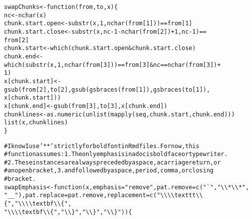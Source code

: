 \documentclass{article}\usepackage[]{graphicx}\usepackage[]{color}
\makeatletter
\newcommand{\hlnum}[1]{\textcolor[rgb]{0.863,0.196,0.184}{#1}}%
\newcommand{\hlstr}[1]{\textcolor[rgb]{0.863,0.196,0.184}{#1}}%
\newcommand{\hlcom}[1]{\textcolor[rgb]{0.345,0.431,0.459}{#1}}%
\newcommand{\hlopt}[1]{\textcolor[rgb]{0.576,0.631,0.631}{#1}}%
\newcommand{\hlstd}[1]{\textcolor[rgb]{0.514,0.58,0.588}{#1}}%
\newcommand{\hlkwa}[1]{\textcolor[rgb]{0.796,0.294,0.086}{#1}}%
\newcommand{\hlkwb}[1]{\textcolor[rgb]{0.522,0.6,0}{#1}}%
\newcommand{\hlkwc}[1]{\textcolor[rgb]{0.796,0.294,0.086}{#1}}%
\newcommand{\hlkwd}[1]{\textcolor[rgb]{0.576,0.631,0.631}{#1}}%
\newenvironment{kframe}{%
 \def\at@end@of@kframe{}%
 \ifinner\ifhmode%
  \def\at@end@of@kframe{\end{minipage}}%
  \begin{minipage}{\columnwidth}%
 \fi\fi%
 \def\FrameCommand##1{\hskip\@totalleftmargin \hskip-\fboxsep
 \colorbox{shadecolor}{##1}\hskip-\fboxsep
     \hskip-\linewidth \hskip-\@totalleftmargin \hskip\columnwidth}%
 \MakeFramed {\advance\hsize-\width
   \@totalleftmargin\z@ \linewidth\hsize
   \@setminipage}}%
 {\par\unskip\endMakeFramed%
 \at@end@of@kframe}
\newenvironment{knitrout}{}{} %
\makeatother
\begin{document}
\begin{knitrout}
\begin{kframe}
\begin{alltt}
    \hlstd{swapChunks} \hlkwb{<-} \hlkwa{function}\hlstd{(}\hlkwc{from}\hlstd{,} \hlkwc{to}\hlstd{,} \hlkwc{x}\hlstd{) \{}
        \hlstd{nc} \hlkwb{<-} \hlkwd{nchar}\hlstd{(x)}
        \hlstd{chunk.start.open} \hlkwb{<-} \hlkwd{substr}\hlstd{(x,} \hlnum{1}\hlstd{,} \hlkwd{nchar}\hlstd{(from[}\hlnum{1}\hlstd{]))} \hlopt{==} \hlstd{from[}\hlnum{1}\hlstd{]}
        \hlstd{chunk.start.close} \hlkwb{<-} \hlkwd{substr}\hlstd{(x, nc} \hlopt{-} \hlnum{1} \hlopt{-} \hlkwd{nchar}\hlstd{(from[}\hlnum{2}\hlstd{])} \hlopt{+} \hlnum{1}\hlstd{, nc} \hlopt{-} \hlnum{1}\hlstd{)} \hlopt{==}
            \hlstd{from[}\hlnum{2}\hlstd{]}
        \hlstd{chunk.start} \hlkwb{<-} \hlkwd{which}\hlstd{(chunk.start.open} \hlopt{&} \hlstd{chunk.start.close)}
        \hlstd{chunk.end} \hlkwb{<-} \hlkwd{which}\hlstd{(}\hlkwd{substr}\hlstd{(x,} \hlnum{1}\hlstd{,} \hlkwd{nchar}\hlstd{(from[}\hlnum{3}\hlstd{]))} \hlopt{==} \hlstd{from[}\hlnum{3}\hlstd{]} \hlopt{&} \hlstd{nc} \hlopt{==} \hlkwd{nchar}\hlstd{(from[}\hlnum{3}\hlstd{])} \hlopt{+}
            \hlnum{1}\hlstd{)}
        \hlstd{x[chunk.start]} \hlkwb{<-} \hlkwd{gsub}\hlstd{(from[}\hlnum{2}\hlstd{], to[}\hlnum{2}\hlstd{],} \hlkwd{gsub}\hlstd{(}\hlkwd{gsbraces}\hlstd{(from[}\hlnum{1}\hlstd{]),} \hlkwd{gsbraces}\hlstd{(to[}\hlnum{1}\hlstd{]),}
            \hlstd{x[chunk.start]))}
        \hlstd{x[chunk.end]} \hlkwb{<-} \hlkwd{gsub}\hlstd{(from[}\hlnum{3}\hlstd{], to[}\hlnum{3}\hlstd{], x[chunk.end])}
        \hlstd{chunklines} \hlkwb{<-} \hlkwd{as.numeric}\hlstd{(}\hlkwd{unlist}\hlstd{(}\hlkwd{mapply}\hlstd{(seq, chunk.start, chunk.end)))}
        \hlkwd{list}\hlstd{(x, chunklines)}
    \hlstd{\}}

    \hlcom{# I know I use '**' strictly for bold font in Rmd files.  For now, this}
    \hlcom{# function assumes: 1. The only emphasis in a doc is boldface or typewriter.}
    \hlcom{# 2. These instances are always preceded by a space, a carriage return, or}
    \hlcom{# an open bracket, 3. and followed by a space, period, comma, or closing}
    \hlcom{# bracket.}
    \hlstd{swapEmphasis} \hlkwb{<-} \hlkwa{function}\hlstd{(}\hlkwc{x}\hlstd{,} \hlkwc{emphasis} \hlstd{=} \hlstr{"remove"}\hlstd{,} \hlkwc{pat.remove} \hlstd{=} \hlkwd{c}\hlstd{(}\hlstr{"`"}\hlstd{,} \hlstr{"\textbackslash{}\textbackslash{}*\textbackslash{}\textbackslash{}*"}\hlstd{,}
        \hlstr{"__"}\hlstd{),} \hlkwc{pat.replace} \hlstd{= pat.remove,} \hlkwc{replacement} \hlstd{=} \hlkwd{c}\hlstd{(}\hlstr{"\textbackslash{}\textbackslash{}\textbackslash{}\textbackslash{}texttt\textbackslash{}\textbackslash{}\{"}\hlstd{,} \hlstr{"\textbackslash{}\textbackslash{}\textbackslash{}\textbackslash{}textbf\textbackslash{}\textbackslash{}\{"}\hlstd{,}
        \hlstr{"\textbackslash{}\textbackslash{}\textbackslash{}\textbackslash{}textbf\textbackslash{}\textbackslash{}\{"}\hlstd{,} \hlstr{"\textbackslash{}\textbackslash{}\}"}\hlstd{,} \hlstr{"\textbackslash{}\textbackslash{}\}"}\hlstd{,} \hlstr{"\textbackslash{}\textbackslash{}\}"}\hlstd{)) \{}


\end{alltt}
\end{kframe}
\end{knitrout}
\end{document}
